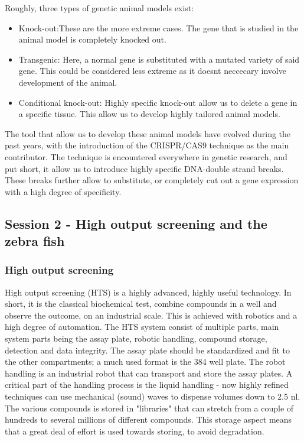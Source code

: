 \documentclass[12p]{article}
\begin{document}
Roughly, three types of genetic animal models exist:

\begin{itemize}
\item
    Knock-out:These are the more extreme cases. 
    The gene that is studied in the animal model is completely knocked out.
\item
    Transgenic: Here, a normal gene is substituted with a mutated variety of said gene.
    This could be considered less extreme as it doesnt neccecary involve development of the animal.
\item
    Conditional knock-out: Highly specific knock-out allow us to delete a gene in a specific tissue.
    This allow us to develop highly tailored animal models.
\end{itemize}

The tool that allow us to develop these animal models have evolved during the past years, with the introduction of the CRISPR/CAS9 technique as the main contributor.
The technique is encountered everywhere in genetic research, and put short, it allow us to introduce highly specific DNA-double strand breaks.
These breaks further allow to substitute, or completely cut out a gene expression with a high degree of specificity.

\subsection*{Session 2 - High output screening and the zebra fish}

\subsubsection*{High output screening}

High output screening (HTS) is a highly advanced, highly useful technology. 
In short, it is the classical biochemical test, combine compounds in a well and observe the outcome, on an industrial scale.
This is achieved with robotics and a high degree of automation.
The HTS system consist of multiple parts, main system parts being the assay plate, robotic handling, compound storage, detection and data integrity.
The assay plate should be standardized and fit to the other compartments; a much used format is the 384 well plate.
The robot handling is an industrial robot that can transport and store the assay plates. 
A critical part of the handling process is the liquid handling - now highly refined techniques can use mechanical (sound) waves to dispense volumes down to 2.5 nl.
The various compounds is stored in "libraries" that can stretch from a couple of hundreds to several millions of different compounds.
This storage aspect means that a great deal of effort is used towards storing, to avoid degradation.
\end{document}
